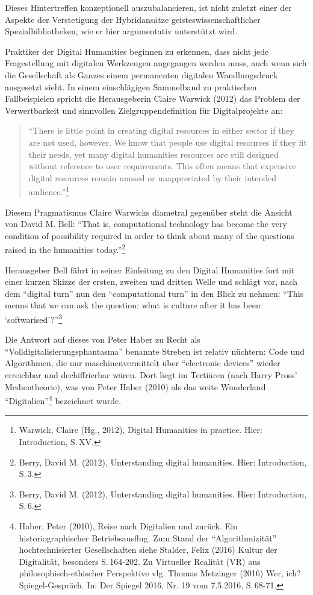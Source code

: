 \documentclass[a4paper,
fontsize=11pt,
oneside,
numbers=noperiodatend,
parskip=half-,
bibliography=totoc,
final
]{scrartcl}
\begin{document}
Dieses Hintertreffen konzeptionell auszubalancieren, ist nicht zuletzt
einer der Aspekte der Verstetigung der Hybridansätze
geisteswissenschaftlicher Spezialbibliotheken, wie er hier argumentativ
unterstützt wird.

Praktiker der Digital Humanities beginnen zu erkennen, dass nicht jede
Fragestellung mit digitalen Werkzeugen angegangen werden muss, auch wenn
sich die Gesellschaft als Ganzes einem permanenten digitalen
Wandlungsdruck ausgesetzt sieht. In einem einschlägigen Sammelband zu
praktischen Fallbeispielen spricht die Herausgeberin Claire Warwick
(2012) das Problem der Verwertbarkeit und sinnvollen
Zielgruppendefinition für Digitalprojekte an:

\begin{quote}
\enquote{There is little point in creating digital resources in either
sector if they are not used, however. We know that people use digital
resources if they fit their needs, yet many digital humanities resources
are still designed without reference to user requirements. This often
means that expensive digital resources remain unused or unappreciated by
their intended audience.}\footnote{Warwick, Claire (Hg., 2012), Digital
  Humanities in practice. Hier: Introduction, S.\,XV.}
\end{quote}

Diesem Pragmatismus Claire Warwicks diametral gegenüber steht die
Ansicht von David M. Bell: \enquote{That is, computational technology
has become the very condition of possibility required in order to think
about many of the questions raised in the humanities today.}\footnote{Berry,
  David M. (2012), Unterstanding digital humanities. Hier: Introduction,
  S.\,3.}

Herausgeber Bell fährt in seiner Einleitung zu den Digital Humanities
fort mit einer kurzen Skizze der ersten, zweiten und dritten Welle und
schlägt vor, nach dem \enquote{digital turn} nun den
\enquote{computational turn} in den Blick zu nehmen: \enquote{This means
that we can ask the question: what is culture after it has been
\enquote{softwarised}?}\footnote{Berry, David M. (2012), Unterstanding
  digital humanities. Hier: Introduction, S.\,6.}

Die Antwort auf dieses von Peter Haber zu Recht als
\enquote{Volldigitalisierungsphantasma} benannte Streben ist relativ
nüchtern: Code und Algorithmen, die nur maschinenvermittelt über
\enquote{electronic devices} wieder erreichbar und dechiffrierbar wären.
Dort liegt im Tertiären (nach Harry Pross' Medientheorie), was von Peter
Haber (2010) als das weite Wunderland \enquote{Digitalien}\footnote{Haber,
  Peter (2010), Reise nach Digitalien und zurück. Ein
  historiographischer Betriebsausflug. Zum Stand der
  \enquote{Algorithmizität} hochtechnisierter Gesellschaften siehe
  Stalder, Felix (2016) Kultur der Digitalität, besonders S.\,164-202. Zu
  Virtueller Realität (VR) aus philosophisch-ethischer Perspektive vlg.
  Thomas Metzinger (2016) Wer, ich? Spiegel-Gespräch. In: Der Spiegel
  2016, Nr. 19 vom 7.5.2016, S.\,68-71.} bezeichnet wurde.
\end{document}
